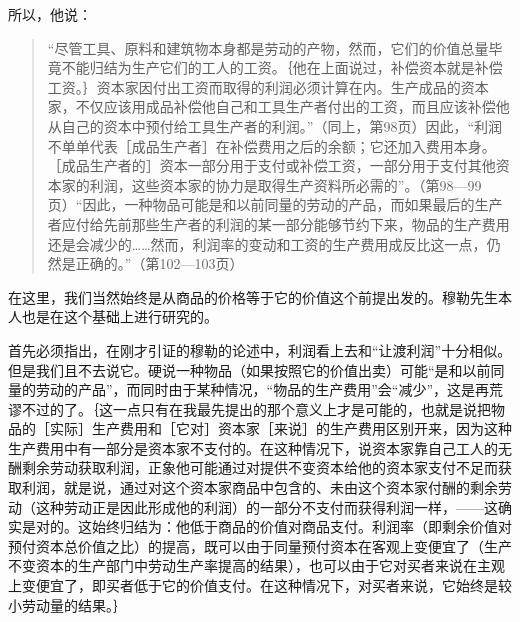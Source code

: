 所以，他说：

\begin{quote}{“尽管工具、原料和建筑物本身都是劳动的产物，然而，它们的价值总量毕竟不能归结为生产它们的工人的工资。｛他在上面说过，补偿资本就是补偿工资。｝资本家因付出工资而取得的利润必须计算在内。生产成品的资本家，不仅应该用成品补偿他自己和工具生产者付出的工资，而且应该补偿他从自己的资本中预付给工具生产者的利润。”（同上，第98页）因此，“利润不单单代表［成品生产者］在补偿费用之后的余额；它还加入费用本身。［成品生产者的］资本一部分用于支付或补偿工资，一部分用于支付其他资本家的利润，这些资本家的协力是取得生产资料所必需的”。（第98—99页）“因此，一种物品可能是和以前同量的劳动的产品，而如果最后的生产者应付给先前那些生产者的利润的某一部分能够节约下来，物品的生产费用还是会减少的……然而，利润率的变动和工资的生产费用成反比这一点，仍然是正确的。”（第102—103页）}\end{quote}

在这里，我们当然始终是从商品的价格等于它的价值这个前提出发的。穆勒先生本人也是在这个基础上进行研究的。

首先必须指出，在刚才引证的穆勒的论述中，利润看上去和“让渡利润”十分相似。但是我们且不去说它。硬说一种物品（如果按照它的价值出卖）可能“是和以前同量的劳动的产品”，而同时由于某种情况，“物品的生产费用”会“减少”，这是再荒谬不过的了。｛这一点只有在我最先提出的那个意义上才是可能的，也就是说把物品的［实际］生产费用和［它对］资本家［来说］的生产费用区别开来，因为这种生产费用中有一部分是资本家不支付的。在这种情况下，说资本家靠自己工人的无酬剩余劳动获取利润，正象他可能通过对提供不变资本给他的资本家支付不足而获取利润，就是说，通过对这个资本家商品中包含的、未由这个资本家付酬的剩余劳动（这种劳动正是因此形成他的利润）的一部分不支付而获得利润一样，——这确实是对的。这始终归结为：他低于商品的价值对商品支付。利润率（即剩余价值对预付资本总价值之比）的提高，既可以由于同量预付资本在客观上变便宜了（生产不变资本的生产部门中劳动生产率提高的结果），也可以由于它对买者来说在主观上变便宜了，即买者低于它的价值支付。在这种情况下，对买者来说，它始终是较小劳动量的结果。｝

